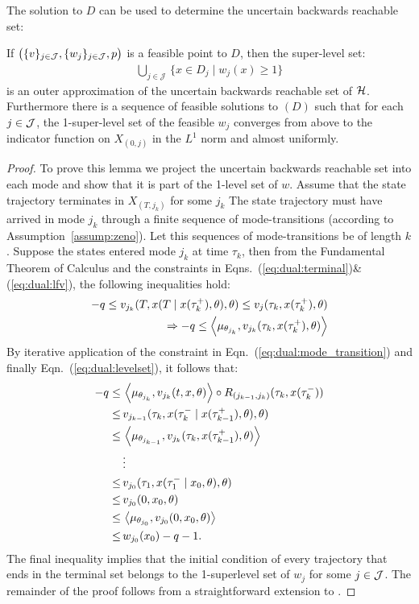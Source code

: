 The solution to $D$ can be used to determine the uncertain backwards reachable set:
\begin{lemma}
	\label{lemma:dual_outerapprox}
If $\big(\{v\}_{j \in {\cal J}},\{w_j\}_{j \in {\cal J}},p\big)$ is a feasible point to $D$, then the super-level set:
\begin{align}
	\bigcup_{j\in \mathcal J}\,\{x \in D_j \mid w_j(x)\ge 1\}
\end{align}
is an outer approximation of the uncertain backwards reachable set of ${\cal H}$.
Furthermore there is a sequence of feasible solutions to $(D)$ such that for each $j \in {\cal J}$, the 1-super-level set of the feasible $w_j$ converges from above to the indicator function on $X_{(0,j)}$ in the $L^1$ norm and almost uniformly.
\end{lemma}

\begin{proof}
To prove this lemma we project the uncertain backwards reachable set into each mode and show that it is part of the 1-level set of $w$.
Assume that the state trajectory terminates in $X_{(T,j_k)}$ for some $j_k$
The state trajectory must have arrived in mode $j_k$ through a finite sequence of mode-transitions (according to Assumption~\ref{assump:zeno}). 
Let this sequences of mode-transitions be of length $k$. 
Suppose the states entered mode $j_k$ at time $\tau_k$, then from the Fundamental Theorem of Calculus and the constraints in Eqns.~(\ref{eq:dual:terminal})\&(\ref{eq:dual:lfv}), the following inequalities hold:
\begin{align}
	-q\le v_{j_k}(T,x(T\mid x(\tau_k^+),\theta),\theta)\le v_j(\tau_k,x(\tau_k^+),\theta)\\
	\Rightarrow -q\le \left\langle \mu_{\theta_{j_k}},v_{j_k}(\tau_k,x(\tau_k^+),\theta)\right\rangle
\end{align}
By iterative application of the constraint in Eqn.~(\ref{eq:dual:mode_transition}) and finally Eqn.~(\ref{eq:dual:levelset}), it follows that:
\begin{align}
	-q\le&\, \left\langle \mu_{\theta_{j_k}},v_{j_k}(t,x,\theta)\right\rangle\circ R_{(j_{k-1},j_{k})}(\tau_{k},x(\tau_{k}^-))\\
      \le&\, v_{j_{k-1}}(\tau_{k},x(\tau_{k}^-\mid x(\tau_{k-1}^+),\theta),\theta)\\
      \le &\, \left\langle \mu_{\theta_{j_{k-1}}},v_{j_k}(\tau_k,x(\tau_{k-1}^+),\theta)\right\rangle\\\nonumber
      &\,\vdots\\
      \le &\,v_{j_0}(\tau_1,x(\tau_1^-\mid x_0,\theta),\theta)\\
      \le &\,v_{j_0}(0,x_0,\theta)\\
      \le &\,\left\langle \mu_{\theta_{j_0}},v_{j_0}(0,x_0,\theta)\right\rangle\\
      \le &\, w_{j_0}(x_0)-q-1.
\end{align}
The final inequality implies that the initial condition of every trajectory that ends in the terminal set belongs to the 1-superlevel set of $w_j$ for some $j \in {\cal J}$.
The remainder of the proof follows from a straightforward extension to \cite[Theorem 2]{henrion2014convex}.
\end{proof}

